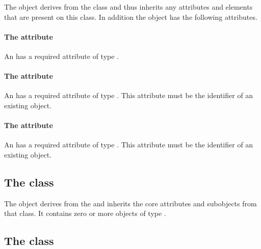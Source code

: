 The \AdjacentDomains object derives from the \SBase class and thus
inherits any attributes and elements that are present on this class.
In addition the \AdjacentDomains object has the following attributes.

\paragraph{The \fixttspace{} attribute}

An \AdjacentDomains has a required attribute  of type
.


\paragraph{The \fixttspace{} attribute}

An \AdjacentDomains has a required attribute  of type
.
This attribute must be the identifier of an existing \Domain object.


\paragraph{The \fixttspace{} attribute}

An \AdjacentDomains has a required attribute  of type
.
This attribute must be the identifier of an existing \Domain object.


\subsection{The  class}
\label{listofgeometrydefinitions-class}


The \ListOfGeometryDefinitions object derives from the  and
inherits the core attributes and subobjects from that class. It contains
zero or more objects of type \GeometryDefinition.

\subsection{The  class}
\label{geometrydefinition-class}

